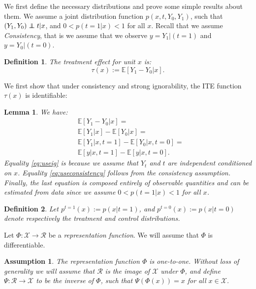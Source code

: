 \documentclass{article}
\newtheorem{thmappdef}{Definition}
\newtheorem{thmappasmp}{Assumption}
\newtheorem{thmapplem}{Lemma}
\def\E{\mathbb{E}}
\def\cX{\mathcal X}
\def\cR{\mathcal{R}}
\newcommand\indep{\protect\mathpalette{\protect\independenT}{\perp}}
\def\independenT#1#2{\mathrel{\rlap{$#1#2$}\mkern2mu{#1#2}}}
\newcommand{\pc}{p^{t=0}}
\newcommand{\pt}{p^{t=1}}
\begin{document}
We first define the necessary distributions and prove some simple results about them. We assume a joint distribution function $p(x,t,Y_0,Y_1)$, such that $(Y_1, Y_0)\indep t | x $, and $0<p(t=1|x)<1$ for all $x$. 
Recall that we assume \emph{Consistency}, that is we assume that we observe $y=Y_1|(t=1)$ and $y=Y_0|(t=0)$.

\begin{thmappdef}\label{def:teA}
The treatment effect for unit $x$ is:
$$\tau(x) := \E\left[Y_1 - Y_0 | x \right].$$
\end{thmappdef}

We first show that under consistency and strong ignorability, the ITE function $\tau(x)$ is identifiable:
\begin{thmapplem}
We have:
\begin{align}
&\E\left[Y_1-Y_0|x\right] =\nonumber \\
&\E\left[Y_1 |x\right]-\E\left[Y_0|x\right] =  \label{eq:useig}\\
&\E\left[Y_1|x,t=1\right]-\E\left[Y_0|x, t=0\right] = \label{eq:useconsistency}\\
&\E\left[y|x,t=1\right]-\E\left[y|x, t=0\right] .\nonumber 
\end{align}
Equality \eqref{eq:useig} is because we assume that $Y_t$ and $t$ are independent conditioned on $x$.
Equality \eqref{eq:useconsistency} follows from the consistency assumption.
Finally, the last equation is composed entirely of observable quantities and can be estimated from data since we assume $0<p(t=1|x)<1$ for all $x$.
\end{thmapplem}




\begin{thmappdef}
Let $\pt(x) := p(x|t=1)$, and $\pc(x) := p(x|t=0)$ denote respectively the treatment and control distributions.
\end{thmappdef}



Let $\Phi : \cX \rightarrow \cR$ be a \emph{representation function}. We will assume that $\Phi$ is differentiable.

\begin{thmappasmp}\label{asmp:invA}
The representation function $\Phi $ is one-to-one. Without loss of generality we will assume that $\cR$ is the image of $\cX$ under $\Phi$, and define $\Psi :\cR \rightarrow \cX$ to be the inverse of $\Phi$, such that $\Psi(\Phi(x)) = x$ for all $x \in \cX$.
\end{thmappasmp}
\end{document}
